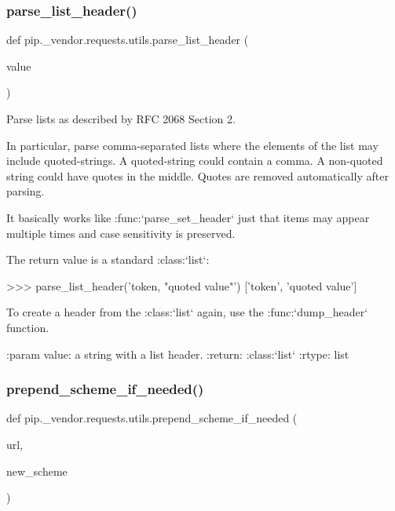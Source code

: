 \subsubsection{\texorpdfstring{parse\+\_\+list\+\_\+header()}{parse\_list\_header()}}
{\footnotesize\ttfamily def pip.\+\_\+vendor.\+requests.\+utils.\+parse\+\_\+list\+\_\+header (\begin{DoxyParamCaption}\item[{}]{value }\end{DoxyParamCaption})}

\begin{DoxyVerb}Parse lists as described by RFC 2068 Section 2.

In particular, parse comma-separated lists where the elements of
the list may include quoted-strings.  A quoted-string could
contain a comma.  A non-quoted string could have quotes in the
middle.  Quotes are removed automatically after parsing.

It basically works like :func:`parse_set_header` just that items
may appear multiple times and case sensitivity is preserved.

The return value is a standard :class:`list`:

>>> parse_list_header('token, "quoted value"')
['token', 'quoted value']

To create a header from the :class:`list` again, use the
:func:`dump_header` function.

:param value: a string with a list header.
:return: :class:`list`
:rtype: list
\end{DoxyVerb}
 \mbox{\label{namespacepip_1_1__vendor_1_1requests_1_1utils_a139f55ace86e6b8e5dc542d2827e9b08}} 
\subsubsection{\texorpdfstring{prepend\+\_\+scheme\+\_\+if\+\_\+needed()}{prepend\_scheme\_if\_needed()}}
{\footnotesize\ttfamily def pip.\+\_\+vendor.\+requests.\+utils.\+prepend\+\_\+scheme\+\_\+if\+\_\+needed (\begin{DoxyParamCaption}\item[{}]{url,  }\item[{}]{new\+\_\+scheme }\end{DoxyParamCaption})}

